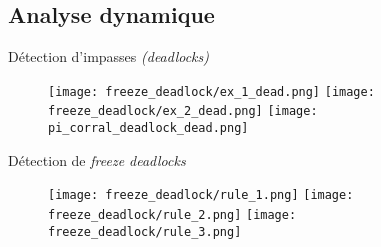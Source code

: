        \subsection{Analyse dynamique}

            \begin{frame}{Détection d'impasses \textit{(deadlocks)}}
                \begin{figure}
                    \centering
                     {
                        \texttt{[image: freeze\_deadlock/ex\_1\_dead.png]}
                    }
                     {
                        \texttt{[image: freeze\_deadlock/ex\_2\_dead.png]}
                    }
                     {
                        \texttt{[image: pi\_corral\_deadlock\_dead.png]}
                    }
                \end{figure}
            \end{frame}

            \begin{frame}{Détection de \textit{freeze deadlocks}}
                \begin{figure}
                     {
                        \texttt{[image: freeze\_deadlock/rule\_1.png]}
                    }
                     {
                        \texttt{[image: freeze\_deadlock/rule\_2.png]}
                    }
                     {
                        \texttt{[image: freeze\_deadlock/rule\_3.png]}
                    }
                \end{figure}
            \end{frame}

